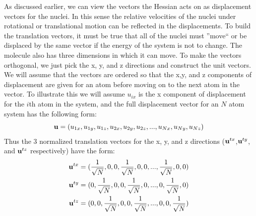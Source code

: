 As discussed earlier, we can view the vectors the Hessian acts on as displacement vectors for the nuclei.  
In this sense the relative velocities of the nuclei under rotational or translational
motion can be reflected in the displacements.  
To build the translation vectors, it must be true that all of the nuclei must ''move`` or be displaced by the same vector if the energy of the system is not 
to change.  
The molecule also has three dimensions in which it can move.  
To make the vectors orthogonal, we just pick the x, y, and z directions and construct the unit vectors.  
We will assume that the vectors are ordered so that the x,y, and z components of displacement are given for an atom before moving on to the next atom in the vector.  
To illustrate this 
we will assume $u_{ix}$ is the x component of displacement for the $i$th atom in the system, and the full displacement vector for an $N$ atom system has the following form:
\begin{equation}
 {\bf{u}}=(u_{1x}, u_{1y}, u_{1z}, u_{2x}, u_{2y}, u_{2z}, . . ., u_{Nx}, u_{Ny}, u_{Nz})
\end{equation}
Thus the 3 normalized translation vectors for the x, y, and z directions (${\bf{u}}^{tx}$,${\bf{u}}^{ty}$, and ${\bf{u}}^{tz}$ respectively) have the form:
\begin{equation}
 \begin{split}
 {\bf{u}}^{tx}&=(\frac{1}{\sqrt{N}}, 0, 0, \frac{1}{\sqrt{N}}, 0, 0,  . . .,\frac{1}{\sqrt{N}}, 0, 0) \\
 {\bf{u}}^{ty}&=(0, \frac{1}{\sqrt{N}}, 0, 0, \frac{1}{\sqrt{N}}, 0,  . . .,0, \frac{1}{\sqrt{N}}, 0) \\
 {\bf{u}}^{tz}&=(0, 0, \frac{1}{\sqrt{N}}, 0, 0, \frac{1}{\sqrt{N}},  . . .,0, 0, \frac{1}{\sqrt{N}})
 \end{split}
\end{equation}

